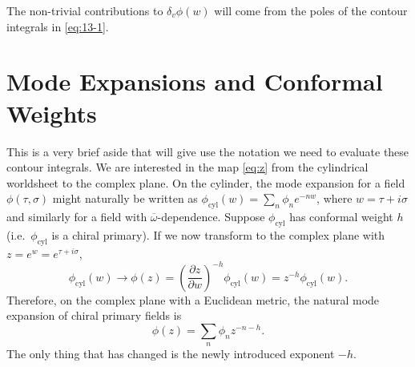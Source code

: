 The non-trivial contributions to $\delta_v \phi(w)$ will come from the poles of the contour integrals in \eqref{eq:13-1}.

\section{Mode Expansions and Conformal Weights}%
\label{sec:mode_expansions_and_conformal_weights}

This is a very brief aside that will give use the notation we need to evaluate these contour integrals.
We are interested in the map \eqref{eq:z} from the cylindrical worldsheet to the complex plane.
On the cylinder, the mode expansion for a field $\phi(\tau, \sigma)$ might naturally be written as $\phi_{\text{cyl}}(w) = \sum_{n} \phi_n e^{-n w}$, where $w = \tau + i \sigma$ and similarly for a field with $\overline{\omega}{}$-dependence.
Suppose $\phi_{\text{cyl}}$ has conformal weight $h$ (i.e.~$\phi_{\text{cyl}}$ is a chiral primary). If we now transform to the complex plane with $z = e^{w} = e^{\tau + i \sigma}$,
\begin{equation}
  \phi_{\text{cyl}}(w) \to \phi(z) = \left( \frac{\partial z}{\partial w} \right)^{-h} \phi_{\text{cyl}}(w) = z^{-h} \phi_{\text{cyl}}(w).
\end{equation}
Therefore, on the complex plane with a Euclidean metric, the natural mode expansion of chiral primary fields is
\begin{equation}
  \boxed{\phi(z) = \sum_{n} \phi_n z^{-n - h}}.
\end{equation}
The only thing that has changed is the newly introduced exponent $-h$.


